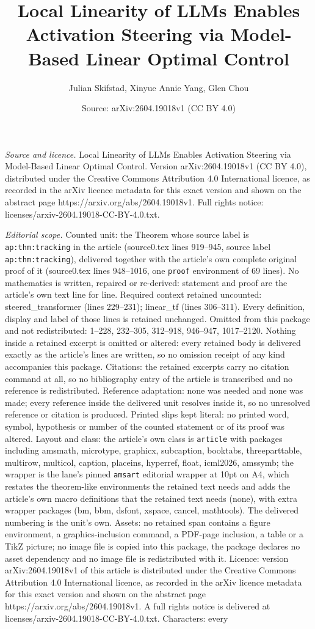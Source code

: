 \documentclass[10pt,a4paper]{amsart}
\title[Local Linearity of LLMs Enables Activation Steering via Mode]{Local Linearity of LLMs Enables Activation Steering via Model-Based Linear Optimal Control}
\author{Julian Skifstad, Xinyue Annie Yang, Glen Chou}
\date{Source: arXiv:2604.19018v1 (CC BY 4.0)}
\begin{document}
\maketitle

\noindent\emph{Source and licence.} Local Linearity of LLMs Enables Activation Steering via Model-Based Linear Optimal Control. Version arXiv:2604.19018v1 (CC BY 4.0), distributed under the Creative Commons Attribution 4.0 International licence, as recorded in the arXiv licence metadata for this exact version and shown on the abstract page https://arxiv.org/abs/2604.19018v1. Full rights notice: licenses/arxiv-2604.19018-CC-BY-4.0.txt.\par\smallskip

\noindent\textit{Editorial scope.} Counted unit: the Theorem whose source label is \texttt{ap:thm:tracking} in the article (source0.tex lines 919--945, source label \texttt{ap:thm:tracking}), delivered together with the article's own complete original proof of it (source0.tex lines 948--1016, one \texttt{proof} environment of 69 lines). No mathematics is written, repaired or re-derived: statement and proof are the article's own text line for line. Required context retained uncounted: steered\_transformer (lines 229--231); linear\_tf (lines 306--311). Every definition, display and label of those lines is retained unchanged. Omitted from this package and not redistributed: 1--228, 232--305, 312--918, 946--947, 1017--2120. Nothing inside a retained excerpt is omitted or altered: every retained body is delivered exactly as the article's lines are written, so no omission receipt of any kind accompanies this package. Citations: the retained excerpts carry no citation command at all, so no bibliography entry of the article is transcribed and no reference is redistributed. Reference adaptation: none was needed and none was made; every reference inside the delivered unit resolves inside it, so no unresolved reference or citation is produced. Printed slips kept literal: no printed word, symbol, hypothesis or number of the counted statement or of its proof was altered. Layout and class: the article's own class is \texttt{article} with packages including amsmath, microtype, graphicx, subcaption, booktabs, threeparttable, multirow, multicol, caption, placeins, hyperref, float, icml2026, amssymb; the wrapper is the lane's pinned \texttt{amsart} editorial wrapper at 10pt on A4, which restates the theorem-like environments the retained text needs and adds the article's own macro definitions that the retained text needs (none), with extra wrapper packages (bm, bbm, dsfont, xspace, cancel, mathtools). The delivered numbering is the unit's own. Assets: no retained span contains a figure environment, a graphics-inclusion command, a PDF-page inclusion, a table or a TikZ picture; no image file is copied into this package, the package declares no asset dependency and no image file is redistributed with it. Licence: version arXiv:2604.19018v1 of this article is distributed under the Creative Commons Attribution 4.0 International licence, as recorded in the arXiv licence metadata for this exact version and shown on the abstract page https://arxiv.org/abs/2604.19018v1. A full rights notice is delivered at licenses/arxiv-2604.19018-CC-BY-4.0.txt. Characters: every 
\end{document}
